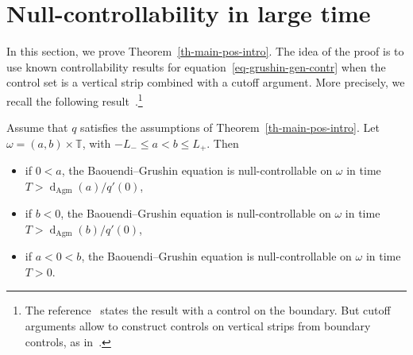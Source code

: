 \documentclass[10pt]{amsart}
\theoremstyle{definition}\newtheorem{defi}[theo]{Definition}\newtheorem{rema}[theo]{Remark}\newtheorem{exam}[theo]{Example}\newtheorem{exem}[theo]{Example}\newtheorem{nota}[theo]{Notation}
\renewcommand{\leq}{\leqslant}
\newcommand{\1}{\mathds 1}
\newcommand{\dagmon}{\mathop{\mathrm{d}}\nolimits_{\mathrm{Agm}}}
\newcommand{\T}{\mathbb{T}}
\renewcommand{\o}{\omega}
\begin{document}
\section{Null-controllability in large time} \label{sec_positive_result}

In this section, we prove Theorem~\ref{th-main-pos-intro}. The idea of the proof is to use known controllability results for equation~\eqref{eq-grushin-gen-contr} when the control set is a vertical strip combined with a cutoff argument. More precisely, we recall the following result~\cite[Theorem~1.4]{BDE20}.\footnote{The reference~\cite{BDE20} states the result with a control on the boundary. But cutoff arguments allow to construct controls on vertical strips from boundary controls, as in~\cite[Appendix A]{DK20}.}

\begin{prop}\label{prop_control_vertical_strip}
Assume that $q$ satisfies the assumptions of Theorem~\ref{th-main-pos-intro}. Let $\omega = (a,b)\times \T$, with $-L_- \leq a < b \leq L_+$. Then
\begin{itemize}
\item if $0< a$, the Baouendi--Grushin equation is null-controllable on $\o$ in time $T> \dagmon(a)/q'(0)$,
\item if $b< 0$, the Baouendi--Grushin equation is null-controllable on $\o$ in time $T> \dagmon(b)/q'(0)$,
\item if $a<0<b$, the Baouendi--Grushin equation is null-controllable on $\o$ in time $T>0$.
\end{itemize}
\end{prop}
\end{document}
